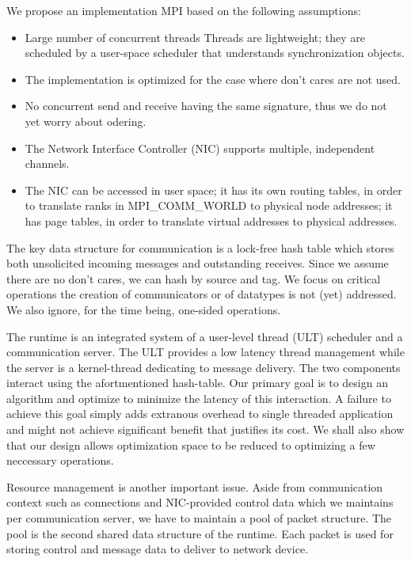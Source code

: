 \documentclass[11pt]{article}
\begin{document}
We propose an implementation MPI based on the following assumptions:
\begin{itemize}
  \item Large number of concurrent threads Threads are lightweight; they are
    scheduled by a user-space scheduler that understands synchronization
    objects.
  \item The implementation is optimized for the case where don't cares are not used.
  \item No concurrent send and receive having the same signature, thus we do not yet worry about odering.
  \item The Network Interface Controller (NIC) supports multiple, independent channels.
  \item The NIC can be accessed in user space; it has its own routing tables,
    in order to translate ranks in MPI\_COMM\_WORLD to physical node addresses;
    it has page tables, in order to translate virtual addresses to physical
    addresses.
\end{itemize}

The key data structure for communication is a lock-free hash table which stores
both unsolicited incoming messages and outstanding receives. Since we assume
there are no don't cares, we can hash by source and tag. We focus on critical
operations the creation of communicators or of datatypes is not (yet)
addressed. We also ignore, for the time being, one-sided operations.

The runtime is an integrated system of a user-level thread (ULT) scheduler and
a communication server. The ULT provides a low latency thread management while
the server is a kernel-thread dedicating to message delivery. The two
components interact using the afortmentioned hash-table.  Our primary goal is
to design an algorithm and optimize to minimize the latency of this
interaction. A failure to achieve this goal simply adds extranous overhead to
single threaded application and might not achieve significant benefit that
justifies its cost. We shall also show that our design allows optimization space
to be reduced to optimizing a few neccessary operations.

Resource management is another important issue. Aside from communication
context such as connections and NIC-provided control data which we maintains
per communication server, we have to maintain a pool of packet structure. The
pool is the second shared data structure of the runtime.  Each packet is used
for storing control and message data to deliver to network device.
\end{document}
